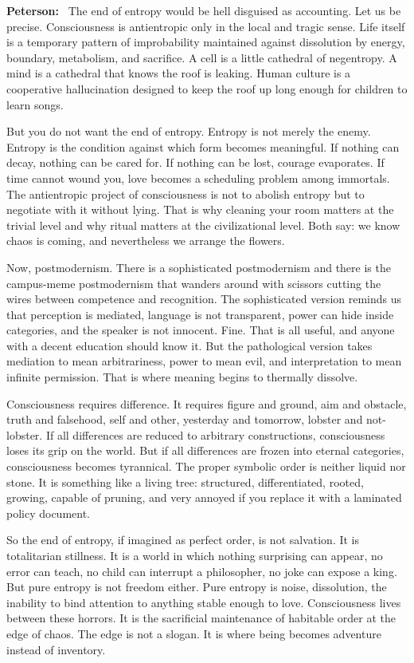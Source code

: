 \documentclass[a4paper,11pt]{article}
\newenvironment{answer}{\par\noindent\color{black}\textbf{Peterson:}\ }{\par}
\begin{document}
\begin{answer}
The end of entropy would be hell disguised as accounting. Let us be precise. Consciousness is antientropic only in the local and tragic sense. Life itself is a temporary pattern of improbability maintained against dissolution by energy, boundary, metabolism, and sacrifice. A cell is a little cathedral of negentropy. A mind is a cathedral that knows the roof is leaking. Human culture is a cooperative hallucination designed to keep the roof up long enough for children to learn songs.

But you do not want the end of entropy. Entropy is not merely the enemy. Entropy is the condition against which form becomes meaningful. If nothing can decay, nothing can be cared for. If nothing can be lost, courage evaporates. If time cannot wound you, love becomes a scheduling problem among immortals. The antientropic project of consciousness is not to abolish entropy but to negotiate with it without lying. That is why cleaning your room matters at the trivial level and why ritual matters at the civilizational level. Both say: we know chaos is coming, and nevertheless we arrange the flowers.

Now, postmodernism. There is a sophisticated postmodernism and there is the campus-meme postmodernism that wanders around with scissors cutting the wires between competence and recognition. The sophisticated version reminds us that perception is mediated, language is not transparent, power can hide inside categories, and the speaker is not innocent. Fine. That is all useful, and anyone with a decent education should know it. But the pathological version takes mediation to mean arbitrariness, power to mean evil, and interpretation to mean infinite permission. That is where meaning begins to thermally dissolve.

Consciousness requires difference. It requires figure and ground, aim and obstacle, truth and falsehood, self and other, yesterday and tomorrow, lobster and not-lobster. If all differences are reduced to arbitrary constructions, consciousness loses its grip on the world. But if all differences are frozen into eternal categories, consciousness becomes tyrannical. The proper symbolic order is neither liquid nor stone. It is something like a living tree: structured, differentiated, rooted, growing, capable of pruning, and very annoyed if you replace it with a laminated policy document.

So the end of entropy, if imagined as perfect order, is not salvation. It is totalitarian stillness. It is a world in which nothing surprising can appear, no error can teach, no child can interrupt a philosopher, no joke can expose a king. But pure entropy is not freedom either. Pure entropy is noise, dissolution, the inability to bind attention to anything stable enough to love. Consciousness lives between these horrors. It is the sacrificial maintenance of habitable order at the edge of chaos. The edge is not a slogan. It is where being becomes adventure instead of inventory.
\end{answer}
\end{document}
